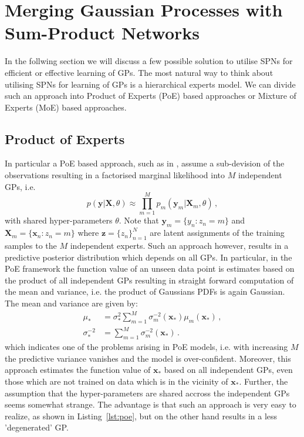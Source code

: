 \documentclass[10pt,letterpaper]{article}
\newcommand{\X}{\mathbf{X}}
\newcommand{\x}{\mathbf{x}}
\newcommand{\y}{\mathbf{y}}
\newcommand{\xn}{\mathbf{x}_{n}}
\newcommand{\new}{_{*}}
\theoremstyle{mystyle}
\begin{document}
\section{Merging Gaussian Processes with Sum-Product Networks}
In the follwing section we will discuss a few possible solution to utilise SPNs for efficient or effective learning of GPs.
The most natural way to think about utilising SPNs for learning of GPs is a hierarchical experts model.
We can divide such an approach into Product of Experts (PoE) based approaches or Mixture of Experts (MoE) based approaches.
\subsection{Product of Experts}
In particular a PoE based approach, such as in \cite{Deisenroth2015}, assume a sub-devision of the observations resulting in a factorised marginal likelihood into $M$ independent GPs, i.e.
\[
  p(\y | \X, \theta) \approx \prod_{m=1}^M p_m(\y_m | \X_m, \theta) \, ,
\]
with shared hyper-parameters $\theta$. Note that $\y_m = \{y_n : z_n = m\}$ and $\X_m = \{\xn : z_n = m\}$ where $\bm z = \{z_n\}_{n=1}^N$ are latent assignments of the training samples to the $M$ independent experts.
Such an approach however, results in a predictive posterior distribution which depends on all GPs.
In particular, in the PoE framework the function value of an unseen data point is estimates based on the product of all independent GPs resulting in straight forward computation of the mean and variance, i.e. the product of  Gaussians PDFs is again Gaussian.
The mean and variance are given by:
\begin{align}
  \mu\new &= \sigma\new^2 \sum_{m=1}^M \sigma_m^{-2}(\x\new) \mu_m(\x\new) \, , \\
  \sigma\new^{-2} &= \sum_{m=1}^M \sigma_m^{-2}(\x\new) \, .
\end{align}
which indicates one of the problems arising in PoE models, i.e. with increasing $M$ the predictive variance vanishes and the model is over-confident. 
Moreover, this approach estimates the function value of $\x\new$ based on all independent GPs, even those which are not trained on data which is in the vicinity of $\x\new$.
Further, the assumption that the hyper-parameters are shared accross the independent GPs seems somewhat strange.
The advantage is that such an approach is very easy to realize, as shown in Listing~\ref{lst:poe}, but on the other hand results in a less 'degenerated' GP.
\end{document}
